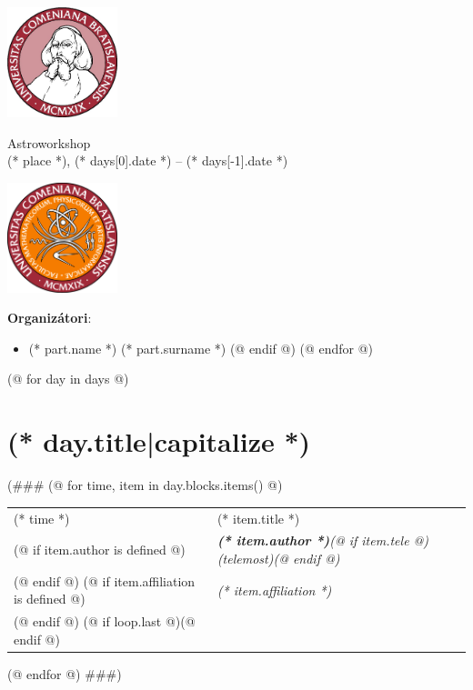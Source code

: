 \documentclass[a4paper]{report}
\begin{document}
    \begin{minipage}{\textwidth}
        \begin{minipage}{0.2\textwidth}
            \includegraphics[width=32mm]{pictures/logo.jpg}
        \end{minipage}
        \begin{minipage}{0.58\textwidth}
            \centering
            \fontsize{40}{50}\selectfont
            Astroworkshop\\
            \Large
            (* place *), (* days[0].date *) -- (* days[-1].date *)
        \end{minipage}
        \begin{minipage}{0.2\textwidth}
            \includegraphics[width=32mm]{pictures/fmfi.png}
        \end{minipage}
    \end{minipage}
    \vspace*{10mm}

    \textbf{Organizátori}:
    \begin{itemize}[itemsep=-2mm]
    (@ for part in participants|sort(attribute='surname') @)
        (@ if part.org @)
            \item (* part.name *) (* part.surname *)
        (@ endif @)
    (@ endfor @)
    \end{itemize}

    (@ for day in days @)
        \section{(* day.title|capitalize *)}
(###
        (@ for time, item in day.blocks.items() @)
            \begin{tabularx}{\textwidth}{>{}p{2cm} >{\RaggedRight}X}
                \midrule
                {\Large (* time *)} & {\Large (* item.title *)} \\
                    (@ if item.author is defined @)
                        & \textit{\textbf{(* item.author *)}(@ if item.tele @) (telemost)(@ endif @)} \\
                    (@ endif @)
                    (@ if item.affiliation is defined @)
                        & \textit{(* item.affiliation *)} \\
                    (@ endif @)
                    (@ if loop.last @)\midrule(@ endif @)
            \end{tabularx}
        (@ endfor @)
###)
\end{document}
